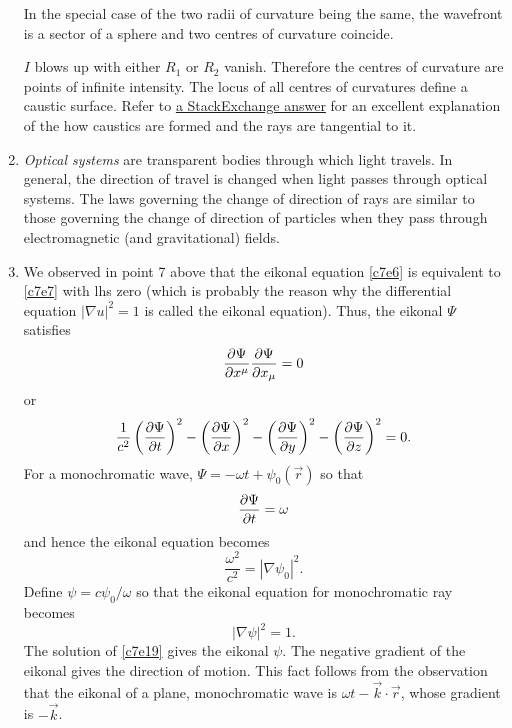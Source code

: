 \begin{enumerate}
In the special case of the two radii of curvature being the same, the wavefront
is a sector of a sphere and two centres of curvature coincide. 

$I$ blows up with either $R_1$ or $R_2$ vanish. Therefore the centres of 
curvature are points of infinite intensity. The locus of all centres of 
curvatures define a caustic surface. Refer to 
\href{https://physics.stackexchange.com/a/256561/10236}{a StackExchange answer} 
for an excellent explanation of the how caustics are formed and the rays are 
tangential to it.

\item \emph{Optical systems} are transparent bodies through which light travels.
In general, the direction of travel is changed when light passes through optical
systems. The laws governing the change of direction of rays are similar to those
governing the change of direction of particles when they pass through 
electromagnetic (and gravitational) fields.

\item We observed in point 7 above that the eikonal equation \eqref{c7e6} is
equivalent to \eqref{c7e7} with lhs zero (which is probably the reason why the 
differential equation $|\nabla u|^2 = 1$ is called the eikonal equation). Thus,
the eikonal $\Psi$ satisfies
\[
\frac{\partial{\Psi}}{\partial{x^\mu}}\frac{\partial{\Psi}}{\partial{x_\mu}} = 0
\]
or
\[
\frac{1}{c^2}\left(\frac{\partial{\Psi}}{\partial{t}}\right)^2 - \left(\frac{\partial{\Psi}}{\partial{x}}\right)^2 - 
\left(\frac{\partial{\Psi}}{\partial{y}}\right)^2 - \left(\frac{\partial{\Psi}}{\partial{z}}\right)^2 = 0.
\]
For a monochromatic wave, $\Psi = -\omega t + \psi_0(\vec{r})$ so that
\[
\frac{\partial{\Psi}}{\partial{t}} = \omega
\]
and hence the eikonal equation becomes
\[
\frac{\omega^2}{c^2} = |\nabla\psi_0|^2.
\]
Define $\psi = c\psi_0/\omega$ so that the eikonal equation for monochromatic
ray becomes
\begin{equation}\label{c7e19}
|\nabla\psi|^2 = 1.
\end{equation}
The solution of \eqref{c7e19} gives the eikonal $\psi$. The negative gradient 
of the eikonal gives the direction of motion. This fact follows from the 
observation that the eikonal of a plane, monochromatic wave is $\omega t - 
\vec{k}\cdot\vec{r}$, whose gradient is $-\vec{k}$.


\end{enumerate}
